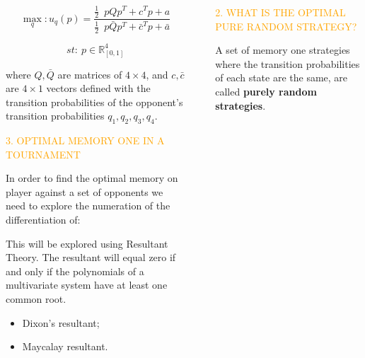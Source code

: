\documentclass[usenames,dvipsnames,t]{beamer}
\newcommand{\R}{\mathbb{R}}
\begin{document}
\begin{columns}
\begin{column}{.4\linewidth}
        \[\max_q: u_q(p) = \frac{\frac{1}{2}\enspace p  Q  p^T + c^T p + a} 
                        {\frac{1}{2}\enspace  p  \bar{Q}  p^T + \bar{c}^T  p + \bar{a}}\]

         \[st:  \ p \in \R^4_{[0, 1]}\]
         \vspace{0.5cm}

        \small{
        where \(Q, \bar{Q}\) are matrices of \(4 \times 4\), and \(c, \bar{c}\) are 
        \(4 \times 1\) vectors  defined with the transition probabilities of the opponent's transition probabilities \(q_1, q_2, q_3, q_4\).}
    \vspace{2cm}

    \textcolor{orange}{\large{3. OPTIMAL MEMORY ONE IN A TOURNAMENT}}
    \vspace{0.3cm}

    \small{
        In order to find the optimal memory on player against a set of opponents
        we need to explore the numeration of the differentiation of:
        
        This will be explored using Resultant Theory. The resultant will equal
        zero if and only if the polynomials of a multivariate system have at least
        one common root.
    }
    \small{
        \begin{itemize}
            \item Dixon's resultant;
            \item Maycalay resultant.
        \end{itemize}
    }
    \end{column}

    \begin{column}{.05\linewidth}
    \end{column}
    \begin{column}{.45\linewidth}
        \vspace{0.9cm}
    
        \textcolor{orange}{\large{2. WHAT IS THE OPTIMAL PURE RANDOM STRATEGY?}}
        \vspace{0.3cm}

        \small{
        A set of memory one strategies where the transition probabilities of each
        state are the same, are called \textbf{purely random strategies}.}
        \vspace{0.5cm}


\end{column}
\end{columns}
\end{document}
